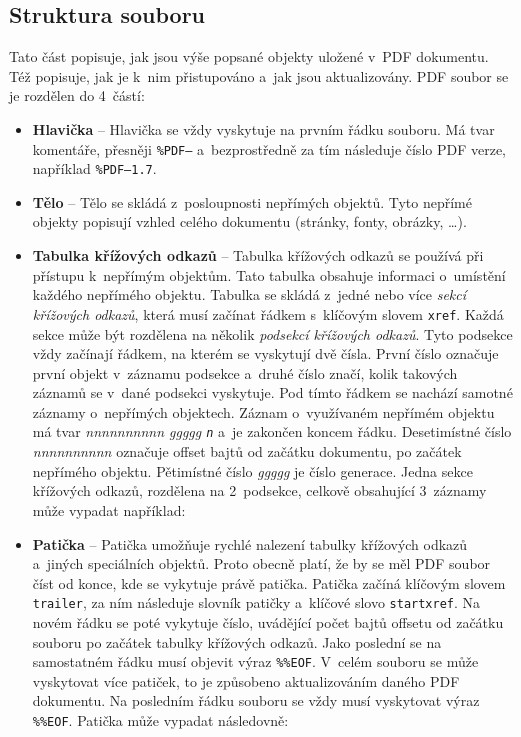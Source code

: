 \subsection*{Struktura souboru}
Tato část popisuje, jak jsou výše popsané objekty uložené v~PDF dokumentu.
Též popisuje, jak je k~nim přistupováno a~jak jsou aktualizovány.
PDF soubor se je rozdělen do 4~částí: 
\begin{itemize}
    \item \textbf{Hlavička} -- Hlavička se vždy vyskytuje na prvním řádku souboru.
    Má tvar komentáře, přesněji \texttt{\%PDF–} a~bezprostředně za tím následuje
    číslo PDF verze, například \texttt{\%PDF–1.7}.
    
    \item \textbf{Tělo} -- Tělo se skládá z~posloupnosti nepřímých objektů. Tyto 
    nepřímé objekty popisují vzhled celého dokumentu (stránky, fonty, obrázky,
    \ldots).
    
    \item \textbf{Tabulka křížových odkazů} -- Tabulka křížových odkazů se používá
    při přístupu k~nepřímým objektům. Tato tabulka obsahuje informaci o~umístění
    každého nepřímého objektu. Tabulka se skládá z~jedné nebo více \emph{sekcí
    křížových odkazů}, která musí začínat řádkem s~klíčovým slovem \texttt{xref}.
    Každá sekce může být rozdělena na několik \emph{podsekcí křížových odkazů}.
    Tyto podsekce vždy začínají řádkem, na kterém se vyskytují dvě čísla. První
    číslo označuje první objekt v~záznamu podsekce a~druhé číslo značí, kolik
    takových záznamů se v~dané podsekci vyskytuje. Pod tímto řádkem se nachází
    samotné záznamy o~nepřímých objektech. Záznam o~využívaném nepřímém objektu
    má tvar \emph{nnnnnnnnnn ggggg \texttt{n}} a~je zakončen koncem řádku.
    Desetimístné číslo \emph{nnnnnnnnnn} označuje offset bajtů od začátku
    dokumentu, po začátek nepřímého objektu. Pětimístné číslo \emph{ggggg} je
    číslo generace. Jedna sekce křížových odkazů, rozdělena na 2~podsekce, celkově
    obsahující 3~záznamy může vypadat například:
    
    \item \textbf{Patička} -- Patička umožňuje rychlé nalezení tabulky křížových
    odkazů a~jiných speciálních objektů. Proto obecně platí, že by se měl PDF
    soubor číst od konce, kde se vykytuje právě patička. Patička začíná klíčovým
    slovem \texttt{trailer}, za ním následuje slovník patičky a~klíčové slovo
    \texttt{startxref}. Na novém řádku se poté vykytuje číslo, uvádějící počet
    bajtů offsetu od začátku souboru po začátek tabulky křížových odkazů. Jako
    poslední se na samostatném řádku musí objevit výraz \texttt{\%\%EOF}.
    V~celém souboru se může vyskytovat více patiček, to je způsobeno aktualizováním
    daného PDF dokumentu. Na posledním řádku souboru se vždy musí vyskytovat
    výraz \texttt{\%\%EOF}. Patička může vypadat následovně:


\end{itemize}
